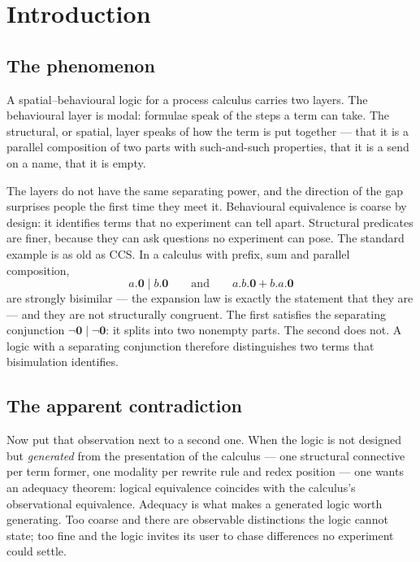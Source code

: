 \documentclass[11pt]{article}
\theoremstyle{plain}
\theoremstyle{definition}
\begin{document}
\tableofcontents

\section{Introduction}
\label{sec:intro}

\subsection{The phenomenon}

A spatial--behavioural logic for a process calculus carries two layers. The behavioural layer is
modal: formulae speak of the steps a term can take. The structural, or spatial, layer speaks of how
the term is put together --- that it is a parallel composition of two parts with such-and-such
properties, that it is a send on a name, that it is empty.

The layers do not have the same separating power, and the direction of the gap surprises people the
first time they meet it. Behavioural equivalence is coarse by design: it identifies terms that no
experiment can tell apart. Structural predicates are finer, because they can ask questions no
experiment can pose. The standard example is as old as CCS. In a calculus with prefix, sum and
parallel composition,
\[
a.\mathbf{0} \mid b.\mathbf{0}
\qquad\text{and}\qquad
a.b.\mathbf{0} + b.a.\mathbf{0}
\]
are strongly bisimilar --- the expansion law is exactly the statement that they are --- and they are
not structurally congruent. The first satisfies the separating conjunction
$\neg\mathbf{0} \mid \neg\mathbf{0}$: it splits into two nonempty parts. The second does not. A logic
with a separating conjunction therefore distinguishes two terms that bisimulation identifies.

\subsection{The apparent contradiction}

Now put that observation next to a second one. When the logic is not designed but \emph{generated}
from the presentation of the calculus --- one structural connective per term former, one modality per
rewrite rule and redex position --- one wants an adequacy theorem: logical equivalence coincides with
the calculus's observational equivalence. Adequacy is what makes a generated logic worth generating.
Too coarse and there are observable distinctions the logic cannot state; too fine and the logic
invites its user to chase differences no experiment could settle.
\end{document}
